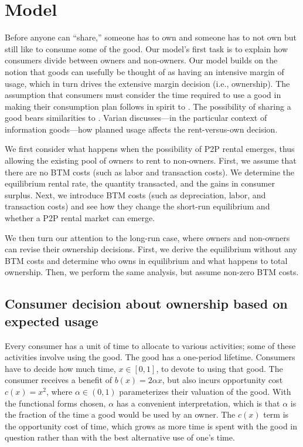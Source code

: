 \documentclass[12pt]{article}
\begin{document}
\section{Model} \label{sec:model}
Before anyone can ``share,'' someone has to own and someone has to not own but still like to consume some of the good.
Our model's first task is to explain how consumers divide between owners and non-owners. 
Our model builds on the notion that goods can usefully be thought of as having an intensive margin of usage, which in turn drives the extensive margin decision (i.e., ownership). 
The assumption that consumers must consider the time required to use a good in making their consumption plan follows in spirit to \cite{becker1965theory}.
The possibility of sharing a good bears similarities to \cite{varian2000}.
Varian discusses---in the particular context of information goods---how planned usage affects the rent-versus-own decision. 

We first consider what happens when the possibility of P2P rental emerges, thus allowing the existing pool of owners to rent to non-owners. 
First, we assume that there are no BTM costs (such as labor and transaction costs).
We determine the equilibrium rental rate, the quantity transacted, and the gains in consumer surplus. 
Next, we introduce BTM costs (such as depreciation, labor, and transaction costs) and see how they change the short-run equilibrium and whether a P2P rental market can emerge. 

We then turn our attention to the long-run case, where owners and non-owners can revise their ownership decisions.
First, we derive the equilibrium without any BTM costs and determine who owns in equilibrium and what happens to total ownership.
Then, we perform the same analysis, but assume non-zero BTM costs. 

\subsection{Consumer decision about ownership based on expected usage}  
Every consumer has a unit of time to allocate to various activities; 
some of these activities involve using the good.  
The good has a one-period lifetime. 
Consumers have to decide how much time, $x \in [0,1]$, to devote to using that good.
The consumer receives a benefit of $b(x) = 2\alpha x$, but also incurs opportunity cost $c(x) = x^2$,  
where $\alpha \in (0,1)$ parameterizes their valuation of the good.
With the functional forms chosen, $\alpha$ has a convenient interpretation, which is that $\alpha$ is the fraction of the time a good would be used by an owner. 
The $c(x)$ term is the opportunity cost of time, which grows as more time is spent with the good in question rather than with the best alternative use of one's time.
\end{document}
